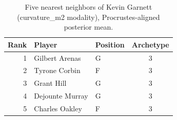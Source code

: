 \begin{table}[htbp]
  \centering\small
  \begin{tabular}{rllc}
    \toprule
    Rank & Player & Position & Archetype \\
    \midrule
    1 & Gilbert Arenas & G & 3 \\
    2 & Tyrone Corbin & F & 3 \\
    3 & Grant Hill & G & 3 \\
    4 & Dejounte Murray & G & 3 \\
    5 & Charles Oakley & F & 3 \\
    \bottomrule
  \end{tabular}
  \caption{Five nearest neighbors of Kevin Garnett (curvature_m2 modality), Procrustes-aligned posterior mean.}
  \label{tab:Kevin_Garnett_neighbors_curvature_m2}
\end{table}

